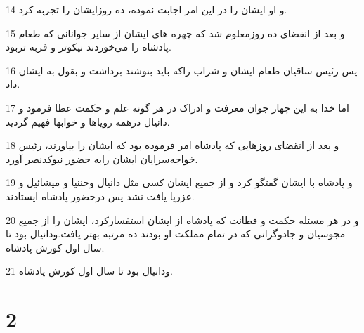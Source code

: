 \par 14 و او ایشان را در این امر اجابت نموده، ده روزایشان را تجربه کرد.
\par 15 و بعد از انقضای ده روزمعلوم شد که چهره های ایشان از سایر جوانانی که طعام پادشاه را می‌خوردند نیکوتر و فربه تربود.
\par 16 پس رئیس ساقیان طعام ایشان و شراب راکه باید بنوشند برداشت و بقول به ایشان داد.
\par 17 اما خدا به این چهار جوان معرفت و ادراک در هر گونه علم و حکمت عطا فرمود و دانیال درهمه رویاها و خوابها فهیم گردید.
\par 18 و بعد از انقضای روزهایی که پادشاه امر فرموده بود که ایشان را بیاورند، رئیس خواجه‌سرایان ایشان رابه حضور نبوکدنصر آورد.
\par 19 و پادشاه با ایشان گفتگو کرد و از جمیع ایشان کسی مثل دانیال وحننیا و میشائیل و عزریا یافت نشد پس درحضور پادشاه ایستادند.
\par 20 و در هر مسئله حکمت و فطانت که پادشاه از ایشان استفسارکرد، ایشان را از جمیع مجوسیان و جادوگرانی که در تمام مملکت او بودند ده مرتبه بهتر یافت.ودانیال بود تا سال اول کورش پادشاه.
\par 21 ودانیال بود تا سال اول کورش پادشاه.

\chapter{2}

